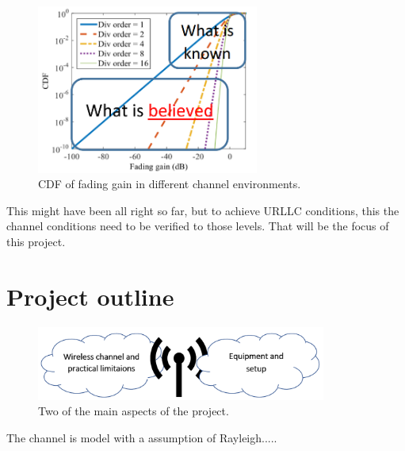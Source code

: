 \begin{figure}[H]
\centering
\includegraphics[width=0.65\textwidth]{figures/fading_gain.png}
\caption{\Gls{CDF} of fading gain in different channel environments.}
\label{fading_gain}
\end{figure}

This might have been all right so far, but to achieve URLLC conditions, this the channel conditions need to be verified to those levels. That will be the focus of this project.


\section{Project outline}

\begin{figure}[H]
\centering
\includegraphics[width=0.85\textwidth]{figures/ProOutline.png}
\caption{Two of the main aspects of the project.}
\label{ChannelAndEquip}
\end{figure}

The channel is model with a assumption of Rayleigh..... 



